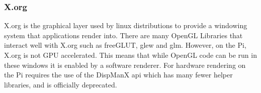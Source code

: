 \subsubsection{X.org}
X.org is the graphical layer used by linux distributions to provide a windowing system that applications render into.  There are many OpenGL Libraries that interact well with X.org such as freeGLUT, glew and glm.  However, on the Pi, X.org is not GPU accelerated.  This means that while OpenGL code can be run in these windows it is enabled by a software renderer.  For hardware rendering on the Pi requires the use of the DispManX api which has many fewer helper libraries, and is officially deprecated.